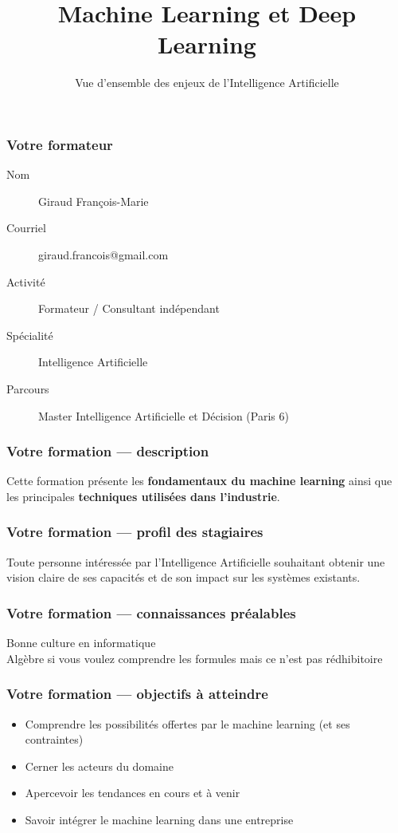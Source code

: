 \documentclass{formation}
\title{Machine Learning et Deep Learning}
\subtitle{Vue d'ensemble des enjeux de l'Intelligence Artificielle}
\begin{document}
\maketitle

\begin{frame}
  \frametitle{Votre formateur}
  \begin{description}
  \item[Nom] Giraud François-Marie
  \item[Courriel] giraud.francois@gmail.com
  \item[Activité] Formateur / Consultant indépendant
  \item[Spécialité] Intelligence Artificielle
  \item[Parcours] Master Intelligence Artificielle et Décision (Paris 6)
  \end{description}
\end{frame}

\begin{frame}
  \frametitle{Votre formation — description}

  Cette formation présente les \textbf{fondamentaux du machine learning} ainsi que les principales \textbf{techniques utilisées dans l’industrie}.
\end{frame}

\begin{frame}
  \frametitle{Votre formation — profil des stagiaires}
  Toute personne intéressée par l'Intelligence Artificielle souhaitant obtenir une vision claire de ses capacités et de son impact sur les systèmes existants.
\end{frame}

\begin{frame}
  \frametitle{Votre formation — connaissances préalables}
  Bonne culture en informatique \\
  Algèbre si vous voulez comprendre les formules mais ce n'est pas rédhibitoire
\end{frame}

\begin{frame}
  \frametitle{Votre formation — objectifs à atteindre}
  \begin{itemize}
  \item Comprendre les possibilités offertes par le machine learning (et ses contraintes)
  \item Cerner les acteurs du domaine
  \item Apercevoir les tendances en cours et à venir
  \item Savoir intégrer le machine learning dans une entreprise
  \end{itemize}
\end{frame}
\end{document}
